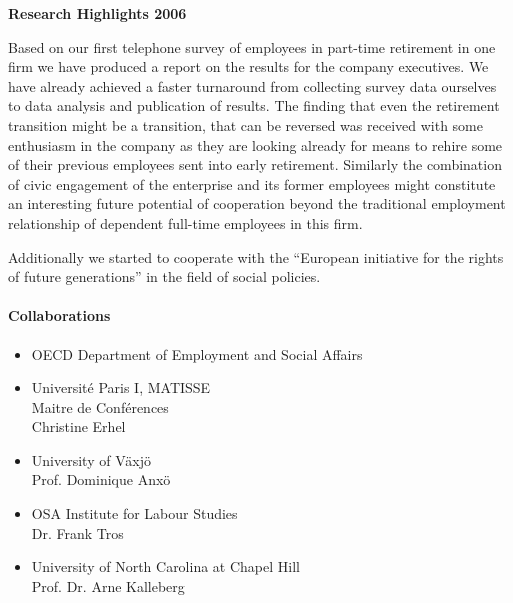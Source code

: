 \textbf{Research Highlights 2006}

 Based on our first telephone survey of employees in part-time retirement in one firm we have produced a report on the results for the company executives. We have already achieved a faster turnaround from collecting survey data ourselves to data analysis and publication of results. The finding that even the retirement transition might be a transition, that can be reversed was received with some enthusiasm in the company as they are looking already for means to rehire some of their previous employees sent into early retirement. Similarly the combination of civic engagement of the enterprise and its former employees might constitute an interesting future potential of cooperation beyond the traditional employment relationship of dependent full-time employees in this firm. 

 Additionally we started to cooperate with the ``European initiative for the rights of future generations'' in the field of social policies. 


\paragraph{Collaborations}
\begin{itemize}
\item OECD Department of Employment and Social Affairs
\item Universit\'e Paris I, MATISSE \\ Maitre de Conf\'erences \\ Christine Erhel
\item University of V\"axj\"o  \\ Prof. Dominique Anx\"o 
\item OSA Institute for Labour Studies  \\ Dr. Frank Tros 
\item University of North Carolina at Chapel Hill  \\ Prof. Dr. Arne Kalleberg
\end{itemize}

\begin{bibunit}[apalike]
\nocite{*}
\putbib[profKlausSchoemann2]
\end{bibunit}


